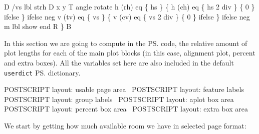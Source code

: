 \documentclass[11pt]{article}
\def\nwendcode{\endtrivlist \endgroup} %
\let\nwdocspar=\par                    %
\begin{document}
      D             %
      /vs           %
        lbl         %
        strh        %
      D             %
      x y T         %
      angle rotate  %
      h (rh) eq \{   %
        hs          %
      \} \{           %
        h (ch) eq \{ %
          hs 2 div  %
        \} \{         %
          0         %
        \} ifelse    %
      \} ifelse      %
      neg           %
      v (tv) eq \{   %
        vs          %
      \} \{           %
        v (cv) eq \{ %
          vs 2 div  %
        \} \{         %
          0         %
        \} ifelse    %
      \} ifelse      %
      neg           %
      m             %
      lbl show      %
    end             %
  R                 %
\} B                 %
\eatline
{}\nwendcode{}\nwdocspar


In this section we are going to compute in the {\ps} code, the relative amount of plot lengths for each of the main plot blocks (in this case, alignment plot, percent and extra boxes). All the variables set here are also included in the default {\tt{}userdict} {\ps} dictionary. 

\nwenddocs{}\endmoddef
%
\LA{}POSTSCRIPT layout: usable page area~{\nwtagstyle{}}\RA{}
\LA{}POSTSCRIPT layout: feature labels~{\nwtagstyle{}}\RA{}
\LA{}POSTSCRIPT layout: group labels~{\nwtagstyle{}}\RA{}
\LA{}POSTSCRIPT layout: aplot box area~{\nwtagstyle{}}\RA{}
\LA{}POSTSCRIPT layout: percent box area~{\nwtagstyle{}}\RA{}
\LA{}POSTSCRIPT layout: extra box area~{\nwtagstyle{}}\RA{}
%
%
\nwendcode{}\nwdocspar

We start by getting how much available room we have in selected page format:
\end{document}
